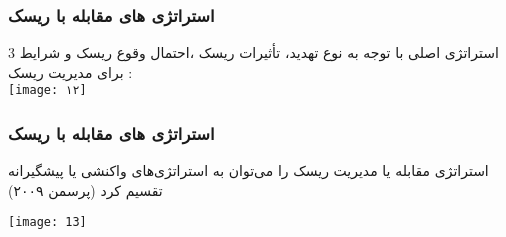 \documentclass[xcolor=dvipsnames,professionalfonts]{beamer}
\begin{document}
\begin{frame}
	\frametitle{استراتژی های مقابله با ریسک }
	3 استراتژی اصلی با توجه به نوع تهدید، تأثیرات ریسک ،احتمال وقوع ریسک و شرایط برای مدیریت ریسک :\\
	
	\centering
			\texttt{[image: ۱۲]}


	
\end{frame}
\begin{frame}
	\frametitle{استراتژی های مقابله با ریسک }
	استراتژی مقابله یا مدیریت ریسک را می‌توان به استراتژی‌های واکنشی یا پیشگیرانه تقسیم کرد (پرسمن ۲۰۰۹)
	\\
	\begin{center}
		\texttt{[image: 13]}
	\end{center}
	
\end{frame}
\end{document}
